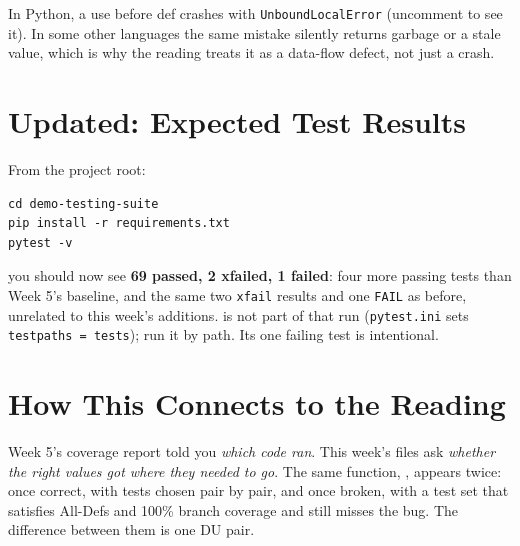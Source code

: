 \documentclass[11pt]{article}
\begin{document}
\begin{tipbox}
In Python, a use before def crashes with \texttt{UnboundLocalError}
(uncomment  to see it). In some other languages
the same mistake silently returns garbage or a stale value, which is why
the reading treats it as a data-flow defect, not just a crash.
\end{tipbox}

\section{Updated: Expected Test Results}
From the project root:
\begin{lstlisting}[style=shellstyle]
cd demo-testing-suite
pip install -r requirements.txt
pytest -v
\end{lstlisting}
you should now see \textbf{69 passed, 2 xfailed, 1 failed}: four more
passing tests than Week 5's baseline, and the same two \texttt{xfail}
results and one \texttt{FAIL} as before, unrelated to this week's
additions.  is not part of that run
(\texttt{pytest.ini} sets \texttt{testpaths = tests}); run it by path.
Its one failing test is intentional.

\section{How This Connects to the Reading}
\begin{keyidea}
Week 5's coverage report told you \emph{which code ran}. This week's
files ask \emph{whether the right values got where they needed to go}.
The same function, , appears twice: once correct,
with tests chosen pair by pair, and once broken, with a test set that
satisfies All-Defs and 100\% branch coverage and still misses the bug.
The difference between them is one DU pair.
\end{keyidea}

\end{document}
